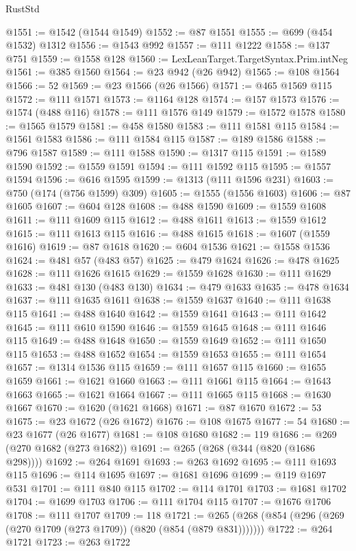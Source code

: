 \begin{lexlean}{RustStd}
\begin{coremodule}
{\begin{coremodule}
{{{{{{{{{{{{{{{{{{{{{{{{{{{{{{{{{{{{{{{{{{{{{{{{{{{{{{{{{{{{{{{{{{{{{{{{{{{{{{@1551 := @1542 (@1544 @1549)
@1552 := @87 @1551
@1555 := @699 (@454 @1532) @1312
@1556 := @1543 @992
@1557 := @111 @1222
@1558 := @137 @751
@1559 := @1558 @128
@1560 := LexLeanTarget.TargetSyntax.Prim.intNeg
@1561 := @385 @1560
@1564 := @23 @942 (@26 @942)
@1565 := @108 @1564
@1566 := 52
@1569 := @23 @1566 (@26 @1566)
@1571 := @465 @1569 @115
@1572 := @111 @1571
@1573 := @1164 @128
@1574 := @157 @1573
@1576 := @1574 (@488 @116)
@1578 := @111 @1576 @149
@1579 := @1572 @1578
@1580 := @1565 @1579
@1581 := @458 @1580
@1583 := @111 @1581 @115
@1584 := @1561 @1583
@1586 := @111 @1584 @115
@1587 := @189 @1586
@1588 := @796 @1587
@1589 := @111 @1588
@1590 := @1317 @115
@1591 := @1589 @1590
@1592 := @1559 @1591
@1594 := @111 @1592 @115
@1595 := @1557 @1594
@1596 := @616 @1595
@1599 := @1313 (@111 @1596 @231)
@1603 := @750 (@174 (@756 @1599) @309)
@1605 := @1555 (@1556 @1603)
@1606 := @87 @1605
@1607 := @604 @128
@1608 := @488 @1590
@1609 := @1559 @1608
@1611 := @111 @1609 @115
@1612 := @488 @1611
@1613 := @1559 @1612
@1615 := @111 @1613 @115
@1616 := @488 @1615
@1618 := @1607 (@1559 @1616)
@1619 := @87 @1618
@1620 := @604 @1536
@1621 := @1558 @1536
@1624 := @481 @57 (@483 @57)
@1625 := @479 @1624
@1626 := @478 @1625
@1628 := @111 @1626 @1615
@1629 := @1559 @1628
@1630 := @111 @1629
@1633 := @481 @130 (@483 @130)
@1634 := @479 @1633
@1635 := @478 @1634
@1637 := @111 @1635 @1611
@1638 := @1559 @1637
@1640 := @111 @1638 @115
@1641 := @488 @1640
@1642 := @1559 @1641
@1643 := @111 @1642
@1645 := @111 @610 @1590
@1646 := @1559 @1645
@1648 := @111 @1646 @115
@1649 := @488 @1648
@1650 := @1559 @1649
@1652 := @111 @1650 @115
@1653 := @488 @1652
@1654 := @1559 @1653
@1655 := @111 @1654
@1657 := @1314 @1536 @115
@1659 := @111 @1657 @115
@1660 := @1655 @1659
@1661 := @1621 @1660
@1663 := @111 @1661 @115
@1664 := @1643 @1663
@1665 := @1621 @1664
@1667 := @111 @1665 @115
@1668 := @1630 @1667
@1670 := @1620 (@1621 @1668)
@1671 := @87 @1670
@1672 := 53
@1675 := @23 @1672 (@26 @1672)
@1676 := @108 @1675
@1677 := 54
@1680 := @23 @1677 (@26 @1677)
@1681 := @108 @1680
@1682 := 119
@1686 := @269 (@270 @1682 (@273 @1682))
@1691 := @265 (@268 (@344 (@820 (@1686 @298))))
@1692 := @264 @1691
@1693 := @263 @1692
@1695 := @111 @1693 @115
@1696 := @114 @1695
@1697 := @1681 @1696
@1699 := @119 @1697 @531
@1701 := @111 @840 @115
@1702 := @114 @1701
@1703 := @1681 @1702
@1704 := @1699 @1703
@1706 := @111 @1704 @115
@1707 := @1676 @1706
@1708 := @111 @1707
@1709 := 118
@1721 := @265 (@268 (@854 (@296 (@269 (@270 @1709 (@273 @1709)) (@820 (@854 (@879 @831)))))))
@1722 := @264 @1721
@1723 := @263 @1722
}}}}}}}}}}}}}}}}}}}}}}}}}}}}}}}}}}}}}}}}}}}}}}}}}}}}}}}}}}}}}}}}}}}}}}}}}}}}}}
\end{coremodule}}
\end{coremodule}
\end{lexlean}
